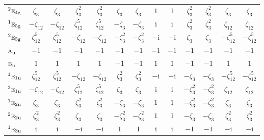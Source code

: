 \documentclass[10pt,a4paper]{article}
\numberwithin{equation}{section}
\newcommand{\irr}[1]{\text{\normalfont\scshape #1}}
\newcommand{\conjpair}[1]{{}^{#1}}
\newcommand{\ptag}[1]{\mathrm{#1}}
\newcommand{\iunit}{\mathrm{i}}
\newcommand{\rootunity}[1]{\zeta_{#1}}
\begin{document}
{\begin{longtable}{@{}lcccccccccccc@{}}
$\conjpair{2}\irr{e}_{4\ptag{g}}$ & $\rootunity{3}$ & $\rootunity{3}$ & $\rootunity{3}^{2}$ & $\rootunity{3}^{2}$ & $\rootunity{3}$ & $\rootunity{3}$ & $1$ & $1$ & $\rootunity{3}^{2}$ & $\rootunity{3}^{2}$ & $\rootunity{3}$ & $\rootunity{3}$\\
$\conjpair{1}\irr{e}_{5\ptag{g}}$ & $-\rootunity{12}$ & $-\rootunity{12}$ & $\rootunity{12}^{5}$ & $\rootunity{12}^{5}$ & $-\rootunity{3}$ & $-\rootunity{3}$ & $\iunit{}$ & $\iunit{}$ & $\rootunity{3}^{2}$ & $\rootunity{3}^{2}$ & $\rootunity{12}$ & $\rootunity{12}$\\
$\conjpair{2}\irr{e}_{5\ptag{g}}$ & $\rootunity{12}^{5}$ & $\rootunity{12}^{5}$ & $-\rootunity{12}$ & $-\rootunity{12}$ & $-\rootunity{3}^{2}$ & $-\rootunity{3}^{2}$ & $-\iunit{}$ & $-\iunit{}$ & $\rootunity{3}$ & $\rootunity{3}$ & $-\rootunity{12}^{5}$ & $-\rootunity{12}^{5}$\\
$\irr{a}_{\ptag{u}}$ & $-1$ & $-1$ & $-1$ & $-1$ & $-1$ & $-1$ & $-1$ & $-1$ & $-1$ & $-1$ & $-1$ & $-1$\\
$\irr{b}_{\ptag{u}}$ & $1$ & $1$ & $1$ & $1$ & $-1$ & $-1$ & $1$ & $1$ & $-1$ & $-1$ & $1$ & $1$\\
$\conjpair{1}\irr{e}_{1\ptag{u}}$ & $\rootunity{12}^{5}$ & $\rootunity{12}^{5}$ & $-\rootunity{12}$ & $-\rootunity{12}$ & $\rootunity{3}^{2}$ & $\rootunity{3}^{2}$ & $-\iunit{}$ & $-\iunit{}$ & $-\rootunity{3}$ & $-\rootunity{3}$ & $-\rootunity{12}^{5}$ & $-\rootunity{12}^{5}$\\
$\conjpair{2}\irr{e}_{1\ptag{u}}$ & $-\rootunity{12}$ & $-\rootunity{12}$ & $\rootunity{12}^{5}$ & $\rootunity{12}^{5}$ & $\rootunity{3}$ & $\rootunity{3}$ & $\iunit{}$ & $\iunit{}$ & $-\rootunity{3}^{2}$ & $-\rootunity{3}^{2}$ & $\rootunity{12}$ & $\rootunity{12}$\\
$\conjpair{1}\irr{e}_{2\ptag{u}}$ & $\rootunity{3}$ & $\rootunity{3}$ & $\rootunity{3}^{2}$ & $\rootunity{3}^{2}$ & $-\rootunity{3}$ & $-\rootunity{3}$ & $1$ & $1$ & $-\rootunity{3}^{2}$ & $-\rootunity{3}^{2}$ & $\rootunity{3}$ & $\rootunity{3}$\\
$\conjpair{2}\irr{e}_{2\ptag{u}}$ & $\rootunity{3}^{2}$ & $\rootunity{3}^{2}$ & $\rootunity{3}$ & $\rootunity{3}$ & $-\rootunity{3}^{2}$ & $-\rootunity{3}^{2}$ & $1$ & $1$ & $-\rootunity{3}$ & $-\rootunity{3}$ & $\rootunity{3}^{2}$ & $\rootunity{3}^{2}$\\
$\conjpair{1}\irr{e}_{3\ptag{u}}$ & $\iunit{}$ & $\iunit{}$ & $-\iunit{}$ & $-\iunit{}$ & $1$ & $1$ & $\iunit{}$ & $\iunit{}$ & $-1$ & $-1$ & $-\iunit{}$ & $-\iunit{}$\\

\end{longtable}}
\end{document}
